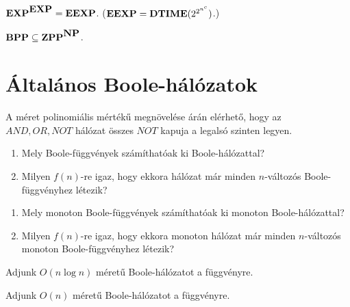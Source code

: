 \begin{Exercise}[counter={sorszam}, difficulty=0]
$\mbox{\ensuremath{\mathbf{EXP}}}^{\mbox{\ensuremath{\mathbf{EXP}}}} = \mbox{\ensuremath{\mathbf{EEXP}}}$. ($\mbox{\ensuremath{\mathbf{EEXP}}} = \mbox{\ensuremath{\mathbf{DTIME}}}(2^{2^{n^c}})$.)
\end{Exercise}


\begin{Exercise}[counter={sorszam}, difficulty=0]
$\mbox{\ensuremath{\mathbf{BPP}}} \subseteq \mbox{\ensuremath{\mathbf{ZPP}}}^{\mbox{\ensuremath{\mathbf{NP}}}}$.

\end{Exercise}



\chapter{Általános Boole-hálózatok}

\begin{Exercise}[counter={sorszam}, difficulty=0]
A méret polinomiális mértékű megnövelése árán elérhető, hogy az $AND,OR,NOT$ hálózat
összes $NOT$ kapuja a legalsó szinten legyen.
\end{Exercise}


\begin{Exercise}[counter={sorszam}, difficulty=0]
\begin{enumerate}
 \item Mely Boole-függvények számíthatóak ki Boole-hálózattal?
 \item Milyen $f(n)$-re igaz, hogy ekkora hálózat már minden $n$-változós Boole-függvényhez létezik?
\end{enumerate}
\end{Exercise}


\begin{Exercise}[counter={sorszam}, difficulty=0]
\begin{enumerate}
 \item Mely monoton Boole-függvények számíthatóak ki monoton Boole-hálózattal?
 \item Milyen $f(n)$-re igaz, hogy ekkora monoton hálózat már minden $n$-változós
 monoton Boole-függvényhez létezik?
\end{enumerate}
\end{Exercise}


\begin{Exercise}[counter={sorszam}, difficulty=0]
Adjunk $O(n \log n)$ méretű Boole-hálózatot a  függvényre.
\end{Exercise}


\begin{Exercise}[counter={sorszam}, difficulty=1]
Adjunk $O(n)$ méretű Boole-hálózatot a  függvényre.

\end{Exercise}


